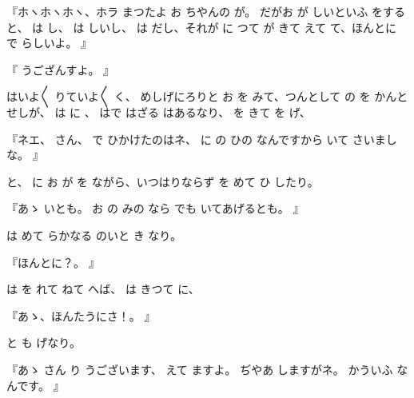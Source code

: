『ホヽホヽホヽ、ホラ
まつたよ
お
ちやんの
が。
だがお
が
しいといふ
をすると、
は
し、
は
しいし、
は
だし、それが
に
つて
が
きて
えて
て、ほんとに
で
らしいよ。
』

『
うござんすよ。
』

はいよ〳〵
りていよ〳〵
く、
めしげにろりと
お
を
みて、つんとして
の
を
かんとせしが、
は
に
、
はで
はざる
はあるなり、
を
きて
を
げ、

『ネエ、
さん、
で
ひかけたのはネ、
に
の
ひの
なんですから
いて
さいましな。
』

と、
に
お
が
を
ながら、いつはりならず
を
めて
ひ
したり。

『あゝ
いとも。
お
の
みの
なら
でも
いてあげるとも。
』

は
めて
らかなる
のいと
き
なり。

『ほんとに？。
』

は
を
れて
ねて
へば、
は
きつて
に、

『あゝ、ほんたうにさ！。
』

と
も
げなり。

『あゝ
さん
り
うございます、
えて
ますよ。
ぢやあ
しますがネ。
かういふ
なんです。
』

